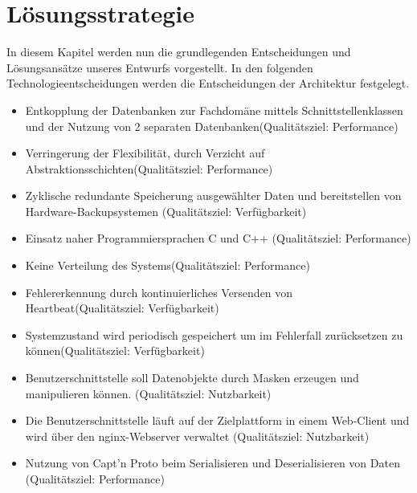 \chapter{Lösungsstrategie}
\label{ch:Lösungsstrategie}
In diesem Kapitel werden nun die grundlegenden Entscheidungen und Lösungsansätze unseres Entwurfs vorgestellt. In den folgenden Technologieentscheidungen werden die Entscheidungen der Architektur festgelegt.  
\begin{itemize}
	\item Entkopplung der Datenbanken zur Fachdomäne mittels Schnittstellenklassen und der Nutzung von 2 separaten Datenbanken(Qualitätsziel: Performance)
	\item Verringerung der Flexibilität, durch Verzicht auf Abstraktionsschichten(Qualitätsziel: Performance)
	\item Zyklische redundante Speicherung ausgewählter Daten und bereitstellen von Hardware-Backupsystemen (Qualitätsziel: Verfügbarkeit)
	\item Einsatz naher Programmiersprachen C und C++ (Qualitätsziel: Performance)
	\item Keine Verteilung des Systems(Qualitätsziel: Performance)
	\item Fehlererkennung durch kontinuierliches Versenden von Heartbeat(Qualitätsziel: Verfügbarkeit)
	\item Systemzustand wird periodisch gespeichert um im Fehlerfall zurücksetzen zu können(Qualitätsziel: Verfügbarkeit) 
	\item Benutzerschnittstelle soll Datenobjekte durch Masken erzeugen und manipulieren können. (Qualitätsziel: Nutzbarkeit) 
	\item Die Benutzerschnittstelle läuft auf der Zielplattform in einem Web-Client und wird über den nginx-Webserver verwaltet (Qualitätsziel: Nutzbarkeit)
	\item Nutzung von Capt'n Proto beim Serialisieren und Deserialisieren von Daten (Qualitätsziel: Performance)
\end{itemize}